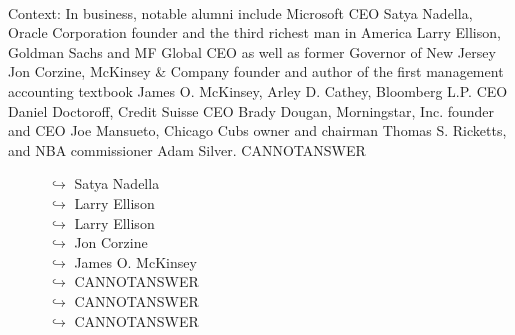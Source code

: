 \documentclass[11pt,a4paper, onecolumn]{article}
\begin{document}
\\ Context: In business, notable alumni include Microsoft CEO Satya Nadella, Oracle Corporation founder and the third richest man in America Larry Ellison, Goldman Sachs and MF Global CEO as well as former Governor of New Jersey Jon Corzine, McKinsey & Company founder and author of the first management accounting textbook James O. McKinsey, Arley D. Cathey, Bloomberg L.P. CEO Daniel Doctoroff, Credit Suisse CEO Brady Dougan, Morningstar, Inc. founder and CEO Joe Mansueto, Chicago Cubs owner and chairman Thomas S. Ricketts, and NBA commissioner Adam Silver. CANNOTANSWER

\begin{figure}[t] \small \begin{tcolorbox}[boxsep=0pt,left=5pt,right=0pt,top=2pt,colback = yellow!5] \begin{dialogue}
 \small 
\colorbox{pink!25}{$\hookrightarrow$}
{ Satya Nadella }
\\
\colorbox{pink!25}{$\hookrightarrow$}
{ Larry Ellison }
\\
\colorbox{pink!25}{$\hookrightarrow$}
{ Larry Ellison }
\\
\colorbox{pink!25}{$\hookrightarrow$}
{ Jon Corzine }
\\
\colorbox{pink!25}{$\hookrightarrow$}
{ James O. McKinsey }
\\
\colorbox{pink!25}{$\hookrightarrow$}
{ CANNOTANSWER }
\\
\colorbox{pink!25}{$\hookrightarrow$}
{ CANNOTANSWER }
\\
\colorbox{pink!25}{$\hookrightarrow$}
{ CANNOTANSWER }
 \end{dialogue}\end{tcolorbox}\end{figure}\begin{figure}[t] \small \begin{tcolorbox}[boxsep=0pt,left=5pt,right=0pt,top=2pt,colback = yellow!5] \begin{dialogue}

\end{dialogue}
\end{tcolorbox}
\end{figure}
\end{document}
